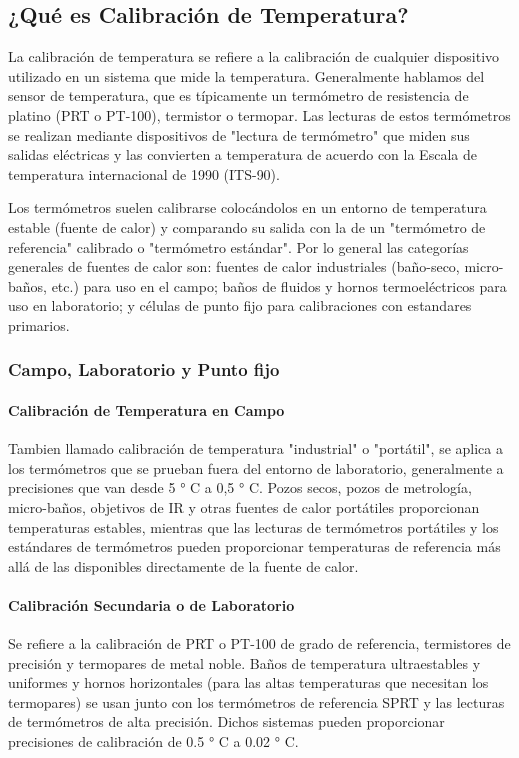 \subsection{¿Qué es Calibración de Temperatura?}
	\par 
		La calibración de temperatura se refiere a la calibración de cualquier dispositivo utilizado en un sistema que mide la temperatura. Generalmente hablamos del sensor de temperatura, que es típicamente un termómetro de resistencia de platino (PRT o PT-100), termistor o termopar. Las lecturas de estos termómetros se realizan mediante dispositivos de "lectura de termómetro" que miden sus salidas eléctricas y las convierten a temperatura de acuerdo con la Escala de temperatura internacional de 1990 (ITS-90).
		
	\par \noindent
		Los termómetros suelen calibrarse colocándolos en un entorno de temperatura estable (fuente de calor) y comparando su salida con la de un "termómetro de referencia" calibrado o "termómetro estándar". Por lo general las categorías generales de fuentes de calor son: fuentes de calor industriales (baño-seco, micro-baños, etc.) para uso en el campo; baños de fluidos y hornos termoeléctricos para uso en laboratorio; y células de punto fijo para calibraciones con estandares primarios.
	
	\subsubsection{Campo, Laboratorio y Punto fijo}
		\paragraph{Calibración de Temperatura en Campo}
			\par 
				Tambien llamado calibración de temperatura "industrial" o "portátil", se aplica a los termómetros que se prueban fuera del entorno de laboratorio, generalmente a precisiones que van desde 5 ° C a 0,5 ° C. Pozos secos, pozos de metrología, micro-baños, objetivos de IR y otras fuentes de calor portátiles proporcionan temperaturas estables, mientras que las lecturas de termómetros portátiles y los estándares de termómetros pueden proporcionar temperaturas de referencia más allá de las disponibles directamente de la fuente de calor.
				
\clearpage
\thispagestyle{plain}

		\paragraph{Calibración Secundaria o de Laboratorio}
			\par 
				Se refiere a la calibración de PRT o PT-100 de grado de referencia, termistores de precisión y termopares de metal noble. Baños de temperatura ultraestables y uniformes y hornos horizontales (para las altas temperaturas que necesitan los termopares) se usan junto con los termómetros de referencia SPRT y las lecturas de termómetros de alta precisión. Dichos sistemas pueden proporcionar precisiones de calibración de 0.5 ° C a 0.02 ° C.
				
